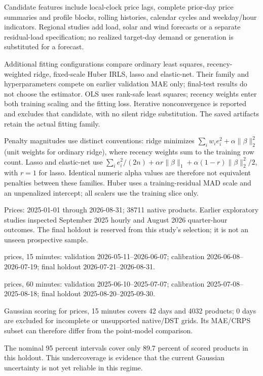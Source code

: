 \documentclass[11pt,a4paper]{article}
\begin{document}
Candidate features include local-clock price lags, complete prior-day price summaries and profile blocks, rolling histories, calendar cycles and weekday/hour indicators. Regional studies add load, solar and wind forecasts or a separate residual-load specification; no realized target-day demand or generation is substituted for a forecast.

Additional fitting configurations compare ordinary least squares, recency-weighted ridge, fixed-scale Huber IRLS, lasso and elastic-net. Their family and hyperparameters compete on earlier validation MAE only; final-test results do not choose the estimator. OLS uses rank-safe least squares; recency weights enter both training scaling and the fitting loss. Iterative nonconvergence is reported and excludes that candidate, with no silent ridge substitution. The saved artifacts retain the actual fitting family.

Penalty magnitudes use distinct conventions: ridge minimizes $\sum_i w_i e_i^2+\alpha\lVert\beta\rVert_2^2$ (unit weights for ordinary ridge), where recency weights sum to the training row count. Lasso and elastic-net use $\sum_i e_i^2/(2n)+\alpha r\lVert\beta\rVert_1+\alpha(1-r)\lVert\beta\rVert_2^2/2$, with $r=1$ for lasso. Identical numeric alpha values are therefore not equivalent penalties between these families. Huber uses a training-residual MAD scale and an unpenalized intercept; all scalers use the training slice only.

Prices: 2025-01-01 through 2026-08-31; 38711 native products. Earlier exploratory studies inspected September 2025 hourly and August 2026 quarter-hour outcomes. The final holdout is reserved from this study's selection; it is not an unseen prospective sample.

prices, 15 minutes: validation 2026-05-11--2026-06-07; calibration 2026-06-08--2026-07-19; final holdout 2026-07-21--2026-08-31.

prices, 60 minutes: validation 2025-06-10--2025-07-07; calibration 2025-07-08--2025-08-18; final holdout 2025-08-20--2025-09-30.

Gaussian scoring for prices, 15 minutes covers 42 days and 4032 products; 0 days are excluded for incomplete or unsupported native/DST grids. Its MAE/CRPS subset can therefore differ from the point-model comparison.

The nominal 95 percent intervals cover only 89.7 percent of scored products in this holdout. This undercoverage is evidence that the current Gaussian uncertainty is not yet reliable in this regime.
\end{document}
